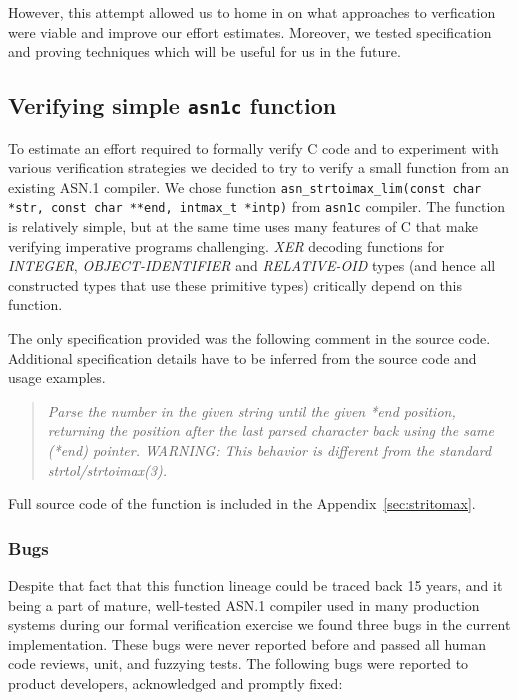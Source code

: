 \documentclass[acmsmall,nonacm]{acmart}
\begin{document}
However, this attempt allowed us to home in on what approaches
to verfication were viable and improve our effort estimates. Moreover, we tested specification and proving techniques which will be useful for us in the future.

\subsection{Verifying simple  \texttt{asn1c} function}

To estimate an effort required to formally verify C code and to
experiment with various verification strategies we decided to try to
verify a small function from an existing ASN.1 compiler. We chose
function \texttt{asn\_strtoimax\_lim(const char *str, const char **end, intmax\_t *intp)} from \texttt{asn1c} compiler.
The function is relatively simple, but at the same time uses many
features of C that make verifying imperative programs
challenging. \emph{XER} decoding functions for \emph{INTEGER},
\emph{OBJECT-IDENTIFIER} and \emph{RELATIVE-OID} types (and hence all
constructed types that use these primitive types) critically depend on
this function.

The only specification provided was the following comment in the
source code. Additional specification details have to be inferred from
the source code and usage examples.

\begin{quote}
 { \it Parse the number in the given string until the given *end position,
 returning the position after the last parsed character back using the
 same (*end) pointer.
 WARNING: This behavior is different from the standard strtol/strtoimax(3). }
\end{quote}

Full source code of the function is included in the Appendix~\ref{sec:stritomax}.

\subsubsection{Bugs}

Despite that fact that this function lineage could be traced back 15
years, and it being a part of mature, well-tested ASN.1 compiler used in
many production systems during our formal verification exercise we
found three bugs in the current implementation. These bugs were never
reported before and passed all human code reviews, unit, and fuzzying
tests. The following bugs were reported to product developers,
acknowledged and promptly fixed:
  
\end{document}
